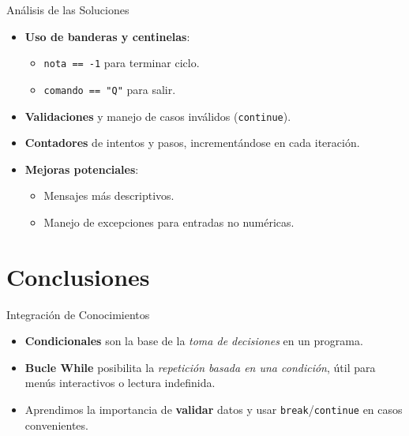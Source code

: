 \documentclass[10pt]{beamer}
\begin{document}
\begin{frame}{Análisis de las Soluciones}
  \begin{itemize}
    \item \textbf{Uso de banderas y centinelas}:
      \begin{itemize}
        \item \texttt{nota == -1} para terminar ciclo.
        \item \texttt{comando == "Q"} para salir.
      \end{itemize}
    \item \textbf{Validaciones} y manejo de casos inválidos (\texttt{continue}).
    \item \textbf{Contadores} de intentos y pasos, incrementándose en cada iteración.
    \item \textbf{Mejoras potenciales}:
      \begin{itemize}
        \item Mensajes más descriptivos.
        \item Manejo de excepciones para entradas no numéricas.
      \end{itemize}
  \end{itemize}
\end{frame}

\section{Conclusiones}

\begin{frame}{Integración de Conocimientos}
  \begin{itemize}
    \item \textbf{Condicionales} son la base de la \textit{toma de decisiones} en un programa.
    \item \textbf{Bucle While} posibilita la \textit{repetición basada en una condición}, útil para menús interactivos o lectura indefinida.
    \item Aprendimos la importancia de \textbf{validar} datos y usar \texttt{break}/\texttt{continue} en casos convenientes.
  \end{itemize}
\end{frame}
\end{document}
